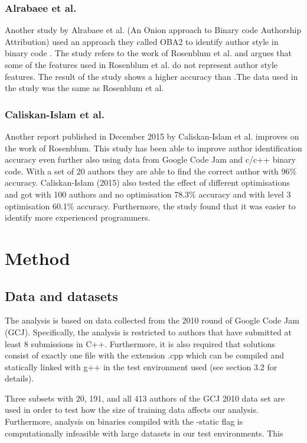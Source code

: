 \documentclass[a4paper,11pt]{kth-mag}
\begin{document}
\subsection{Alrabaee et al.}
Another study by Alrabaee et al. (An Onion approach to Binary code Authorship
Attribution) used an approach they called OBA2 to identify author style in
binary code \parencite{alrabaee2014oba2}. The study refers to the work of
Rosenblum et al. and argues that some of the features used in Rosenblum et al.
do not represent author style features. The result of the study
shows a higher accuracy than \parencite{rosenblum2011wrote}.The data used in
the study was the same as Rosenblum et al. 

\subsection{Caliskan-Islam et al.}
Another report published in December 2015 by Caliskan-Islam et al. improves on
the work of Rosenblum. This study has been able to improve author
identification accuracy even further also using data from Google Code Jam and
c/c++ binary code. With a set of 20 authors they are able to find the correct
author with 96\% accuracy. Caliskan-Islam (2015) also tested the effect of
different optimisations and got with 100 authors and no optimisation 78.3\%
accuracy and with level 3 optimisation 60.1\% accuracy. Furthermore, the study
found that it was easier to identify more experienced programmers.

\chapter{Method} \label{ch:method}
\section{Data and datasets} \label{data-datasets}
The analysis is based on data collected from the 2010 round of Google Code Jam
(GCJ). Specifically, the analysis is restricted to authors that have submitted at
least 8 submissions in C++. Furthermore, it is also required that solutions consist of exactly
one file with the extension .cpp which can be compiled and statically linked
with g++ in the test environment used (see section 3.2 for details).

Three subsets with 20, 191, and all 413 authors of the GCJ 2010 data set are
used in order to test how the size of training data affects our analysis.
Furthermore, analysis on binaries compiled with the -static flag is
computationally infeasible with large datasets in our test environments. This
\end{document}
